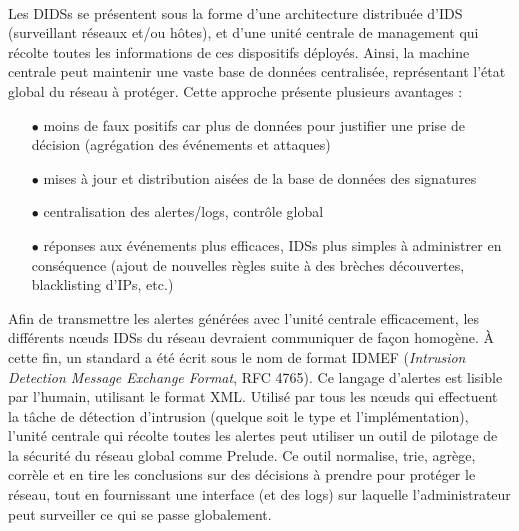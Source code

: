 \documentclass[]{article}
\newcommand{\minit}[1]{\noindent{\small\textbf{ \underline{#1}}}\vspace{0.2cm}}
\begin{document}
~\\
\minit{Les DIDSs}
\par Les DIDSs se présentent sous la forme d'une architecture distribuée d'IDS (surveillant réseaux et/ou hôtes), et d'une unité centrale de management qui récolte toutes les informations de ces dispositifs déployés. Ainsi, la machine centrale peut maintenir une vaste base de données centralisée, représentant l'état global du réseau à protéger. Cette approche présente plusieurs 
avantages :
\vspace{0.2cm}
\begin{itemize}
\item[$\bullet$] moins de faux positifs car plus de données pour justifier une prise de décision (agrégation des événements et attaques)
\vspace{0.2cm}
\item[$\bullet$] mises à jour et distribution aisées de la base de données des signatures
\vspace{0.2cm}
\item[$\bullet$] centralisation des alertes/logs, contrôle global
\vspace{0.2cm}
\item[$\bullet$] réponses aux événements plus efficaces, IDSs plus simples à administrer en conséquence (ajout de nouvelles règles suite à des brèches découvertes, blacklisting d'IPs, etc.)
\end{itemize}
\vspace{0.4cm}

\par Afin de transmettre les alertes générées avec l'unité centrale efficacement, les différents nœuds IDSs du réseau devraient communiquer de façon homogène. À cette fin, un standard a été écrit sous le nom de format IDMEF (\textit{Intrusion Detection Message Exchange Format}, RFC 4765). Ce langage d'alertes est lisible par l'humain, utilisant le format XML. Utilisé par tous les nœuds qui effectuent la tâche de détection d'intrusion (quelque soit le type et l'implémentation), l'unité centrale qui récolte toutes les alertes peut utiliser un outil de pilotage de la sécurité du réseau global comme Prelude. Ce outil normalise, trie, agrège, corrèle et en tire les conclusions sur des décisions à prendre pour protéger le réseau, tout en fournissant une interface (et des logs) sur laquelle l'administrateur peut surveiller ce qui se passe globalement.
\end{document}
